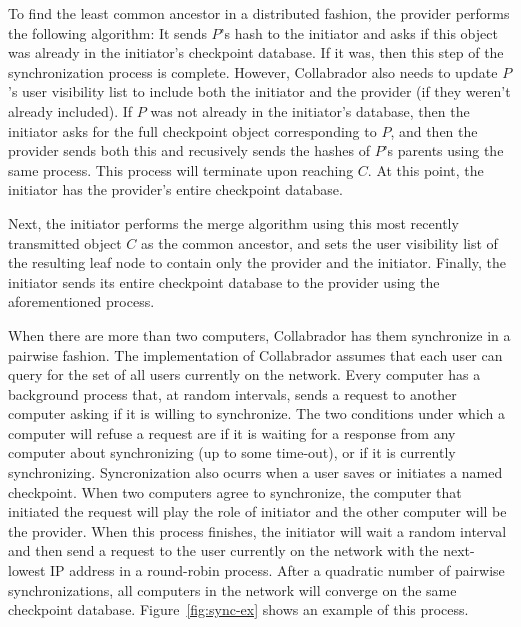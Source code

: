\documentclass[11pt,titlepage]{article}
\begin{document}
To find the least common ancestor in a distributed fashion, the
provider performs the following algorithm: It sends $P$'s hash to the
initiator and asks if this object was already in the initiator's
checkpoint database. If it was, then this step of the synchronization
process is complete. However, Collabrador also needs to update $P$'s
user visibility list to include both the initiator and the provider
(if they weren't already included). If $P$ was not already in the
initiator's database, then the initiator asks for the full checkpoint
object corresponding to $P$, and then the provider sends both this and
recusively sends the hashes of $P$'s parents using the same
process. This process will terminate upon reaching $C$. At this point,
the initiator has the provider's entire checkpoint database.

Next, the initiator performs the merge algorithm using this most
recently transmitted object $C$ as the common ancestor, and sets the
user visibility list of the resulting leaf node to contain only the
provider and the initiator. Finally, the initiator sends its entire
checkpoint database to the provider using the aforementioned process.

When there are more than two computers, Collabrador has them
synchronize in a pairwise fashion. The implementation of Collabrador
assumes that each user can query for the set of all users currently on
the network. Every computer has a background process that, at random
intervals, sends a request to another computer asking if it is willing
to synchronize.  The two conditions under which a computer will refuse
a request are if it is waiting for a response from any computer about
synchronizing (up to some time-out), or if it is currently
synchronizing. Syncronization also ocurrs when a user saves or initiates
a named checkpoint. When two computers agree to synchronize, the computer
that initiated the request will play the role of initiator and the
other computer will be the provider. When this process finishes, the
initiator will wait a random interval and then send a request to
the user currently on the network with the next-lowest IP address in a
round-robin process. After a quadratic number of pairwise
synchronizations, all computers in the network will converge on the
same checkpoint database. Figure~\ref{fig:sync-ex} shows an example of this process.
\end{document}
